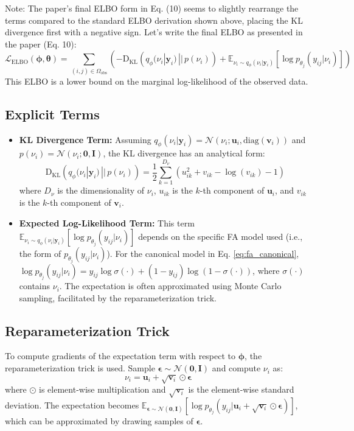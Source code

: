 \documentclass[11pt, letterpaper]{article}
\newcommand{\vy}{\boldsymbol{y}} %
\newcommand{\vtheta}{\boldsymbol{\theta}} %
\newcommand{\vphi}{\boldsymbol{\phi}} %
\newcommand{\vu}{\boldsymbol{u}} %
\newcommand{\vv}{\boldsymbol{v}} %
\newcommand{\vepsilon}{\boldsymbol{\epsilon}} %
\newcommand{\mI}{\boldsymbol{I}} %
\newcommand{\E}{\mathbb{E}} %
\newcommand{\KL}[2]{\text{D}_{\text{KL}}\left(#1 \,||\, #2\right)} %
\newcommand{\Ndist}{\mathcal{N}} %
\newcommand{\sigm}{\sigma} %
\newcommand{\yij}{y_{ij}} %
\newcommand{\nuij}{\nu_{i}} %
\newcommand{\thetaj}{\theta_{j}} %
\newcommand{\Omegaobs}{\Omega_{\text{obs}}} %
\begin{document}
Note: The paper's final ELBO form in Eq. (10) seems to slightly rearrange the terms compared to the standard ELBO derivation shown above, placing the KL divergence first with a negative sign. Let's write the final ELBO as presented in the paper (Eq. 10):
\begin{equation}
    \mathcal{L}_{\text{ELBO}}(\vphi, \vtheta) = \sum_{(i,j) \in \Omegaobs} \left( -\KL{q_{\phi}(\nuij | \vy_i)}{p(\nuij)} + \E_{\nuij \sim q_{\phi}(\nuij | \vy_i)} [\log p_{\thetaj}(\yij | \nuij)] \right)
    \label{eq:elbo_varfa}
\end{equation}
This ELBO is a lower bound on the marginal log-likelihood of the observed data.

\subsection{Explicit Terms}

\begin{itemize}
    \item \textbf{KL Divergence Term:} Assuming $q_{\phi}(\nuij | \vy_i) = \Ndist(\nuij; \vu_i, \text{diag}(\vv_i))$ and $p(\nuij) = \Ndist(\nuij; \mathbf{0}, \mI)$, the KL divergence has an analytical form:
    \begin{equation}
        \KL{q_{\phi}(\nuij | \vy_i)}{p(\nuij)} = \frac{1}{2} \sum_{k=1}^{D_{\nu}} \left( u_{ik}^2 + v_{ik} - \log(v_{ik}) - 1 \right)
        \label{eq:kl_explicit}
    \end{equation}
    where $D_{\nu}$ is the dimensionality of $\nuij$, $u_{ik}$ is the $k$-th component of $\vu_i$, and $v_{ik}$ is the $k$-th component of $\vv_i$.

    \item \textbf{Expected Log-Likelihood Term:} This term $\E_{\nuij \sim q_{\phi}(\nuij | \vy_i)} [\log p_{\thetaj}(\yij | \nuij)]$ depends on the specific FA model used (i.e., the form of $p_{\thetaj}(\yij | \nuij)$). For the canonical model in Eq. \ref{eq:fa_canonical}, $\log p_{\thetaj}(\yij | \nuij) = \yij \log \sigm(\cdot) + (1-\yij) \log(1-\sigm(\cdot))$, where $\sigm(\cdot)$ contains $\nuij$. The expectation is often approximated using Monte Carlo sampling, facilitated by the reparameterization trick.
\end{itemize}

\subsection{Reparameterization Trick}
To compute gradients of the expectation term with respect to $\vphi$, the reparameterization trick is used. Sample $\vepsilon \sim \Ndist(\mathbf{0}, \mI)$ and compute $\nuij$ as:
\begin{equation}
    \nuij = \vu_i + \sqrt{\vv_i} \odot \vepsilon
    \label{eq:reparam_trick}
\end{equation}
where $\odot$ is element-wise multiplication and $\sqrt{\vv_i}$ is the element-wise standard deviation. The expectation becomes $\E_{\vepsilon \sim \Ndist(\mathbf{0}, \mI)} [\log p_{\thetaj}(\yij | \vu_i + \sqrt{\vv_i} \odot \vepsilon)]$, which can be approximated by drawing samples of $\vepsilon$.
\end{document}
